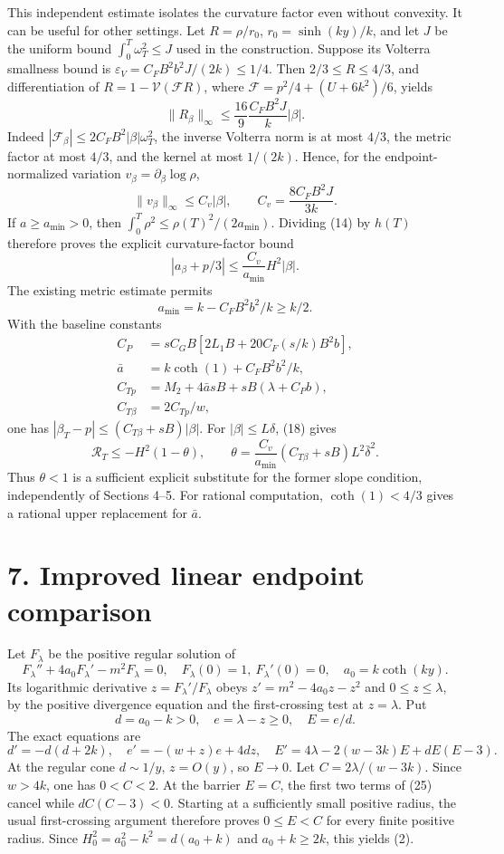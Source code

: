 \documentclass[11pt]{article}
\begin{document}
This independent estimate isolates the curvature factor even without convexity.
It can be useful for other settings. Let \(R=\rho/r_0\),
\(r_0=\sinh(ky)/k\), and let \(J\) be the uniform bound
\(\int_0^T\omega_T^2\leq J\) used in the construction. Suppose its Volterra
smallness bound is \(\varepsilon_V=C_FB^2b^2J/(2k)\leq1/4\).
Then \(2/3\leq R\leq4/3\), and differentiation of
\(R=1-\mathcal V(\mathcal F R)\), where
\(\mathcal F=p^2/4+(U+6k^2)/6\), yields
\[
 \|R_\beta\|_\infty\leq
 \frac{16}{9}\frac{C_FB^2J}{k}|\beta|.
\]
Indeed \(|\mathcal F_\beta|\leq2C_FB^2|\beta|\omega_T^2\), the inverse
Volterra norm is at most \(4/3\), the metric factor at most \(4/3\), and
the kernel at most \(1/(2k)\). Hence, for the endpoint-normalized variation
\(v_\beta=\partial_\beta\log\rho\),
\[
 \|v_\beta\|_\infty\leq C_v|\beta|,
 \qquad C_v=\frac{8C_FB^2J}{3k}.                  \tag{22}
\]
If \(a\geq a_{\min}>0\), then
\(\int_0^T\rho^2\leq\rho(T)^2/(2a_{\min})\). Dividing (14) by \(h(T)\)
therefore proves the explicit curvature-factor bound
\[
 |a_\beta+p/3|\leq\frac{C_v}{a_{\min}}H^2|\beta|. \tag{23}
\]
The existing metric estimate permits
\[
 a_{\min}=k-C_FB^2b^2/k\geq k/2.
\]
With the baseline constants
\[
 \begin{aligned}
 C_P&=sC_GB[2L_1B+20C_F(s/k)B^2b],\\
 \bar a&=k\coth(1)+C_FB^2b^2/k,\\
 C_{Tp}&=M_2+4\bar a sB+sB(\lambda+C_Pb),\\
 C_{T\beta}&=2C_{Tp}/w,
 \end{aligned}
\]
one has \(|\beta_T-p|\leq(C_{T\beta}+sB)|\beta|\). For
\(|\beta|\leq L\delta\), (18) gives
\[
 \mathscr R_T\leq-H^2(1-\theta),\qquad
 \theta=\frac{C_v}{a_{\min}}(C_{T\beta}+sB)L^2\bar\delta^2. \tag{24}
\]
Thus \(\theta<1\) is a sufficient explicit substitute for the former slope
condition, independently of Sections 4--5. For rational computation,
\(\coth(1)<4/3\) gives a rational upper replacement for \(\bar a\).

\section{7. Improved linear endpoint comparison}\label{improved-linear-endpoint-comparison}

Let \(F_\lambda\) be the positive regular solution of
\[
 F_\lambda''+4a_0F_\lambda'-m^2F_\lambda=0,
 \quad F_\lambda(0)=1,\ F_\lambda'(0)=0,
 \quad a_0=k\coth(ky).
\]
Its logarithmic derivative \(z=F_\lambda'/F_\lambda\) obeys
\(z'=m^2-4a_0z-z^2\) and \(0\leq z\leq\lambda\), by the positive divergence
equation and the first-crossing test at \(z=\lambda\). Put
\[
 d=a_0-k>0,\quad e=\lambda-z\geq0,\quad E=e/d.
\]
The exact equations are
\[
 d'=-d(d+2k),\quad
 e'=-(w+z)e+4dz,
 \quad
 E'=4\lambda-2(w-3k)E+dE(E-3).                   \tag{25}
\]
At the regular cone \(d\sim1/y\), \(z=O(y)\), so \(E\to0\). Let
\(C=2\lambda/(w-3k)\). Since \(w>4k\), one has \(0<C<2\). At the
barrier \(E=C\), the first two terms of (25) cancel while
\(dC(C-3)<0\). Starting at a sufficiently small positive radius, the usual
first-crossing argument therefore proves \(0\leq E<C\) for every finite
positive radius. Since
\(H_0^2=a_0^2-k^2=d(a_0+k)\) and \(a_0+k\geq2k\), this yields (2).
\end{document}
